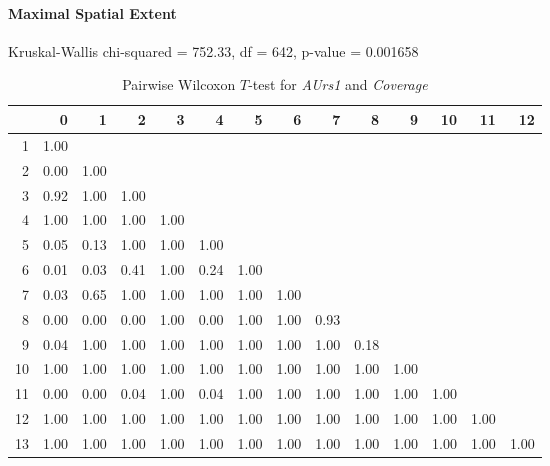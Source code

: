 \paragraph{Maximal Spatial Extent}
Kruskal-Wallis chi-squared = 752.33, df = 642, p-value = 0.001658

\begin{table}[ht]
	\small
	\centering
	\begin{tabular}{rrrrrrrrrrrrrr}
		\hline
	   & 0 & 1 & 2 & 3 & 4 & 5 & 6 & 7 & 8 & 9 & 10 & 11 & 12 \\ 
		\hline
	  1 & 1.00 &  &  &  &  &  &  &  &  &  &  &  &  \\ 
		2 & 0.00 & 1.00 &  &  &  &  &  &  &  &  &  &  &  \\ 
		3 & 0.92 & 1.00 & 1.00 &  &  &  &  &  &  &  &  &  &  \\ 
		4 & 1.00 & 1.00 & 1.00 & 1.00 &  &  &  &  &  &  &  &  &  \\ 
		5 & 0.05 & 0.13 & 1.00 & 1.00 & 1.00 &  &  &  &  &  &  &  &  \\ 
		6 & 0.01 & 0.03 & 0.41 & 1.00 & 0.24 & 1.00 &  &  &  &  &  &  &  \\ 
		7 & 0.03 & 0.65 & 1.00 & 1.00 & 1.00 & 1.00 & 1.00 &  &  &  &  &  &  \\ 
		8 & 0.00 & 0.00 & 0.00 & 1.00 & 0.00 & 1.00 & 1.00 & 0.93 &  &  &  &  &  \\ 
		9 & 0.04 & 1.00 & 1.00 & 1.00 & 1.00 & 1.00 & 1.00 & 1.00 & 0.18 &  &  &  &  \\ 
		10 & 1.00 & 1.00 & 1.00 & 1.00 & 1.00 & 1.00 & 1.00 & 1.00 & 1.00 & 1.00 &  &  &  \\ 
		11 & 0.00 & 0.00 & 0.04 & 1.00 & 0.04 & 1.00 & 1.00 & 1.00 & 1.00 & 1.00 & 1.00 &  &  \\ 
		12 & 1.00 & 1.00 & 1.00 & 1.00 & 1.00 & 1.00 & 1.00 & 1.00 & 1.00 & 1.00 & 1.00 & 1.00 &  \\ 
		13 & 1.00 & 1.00 & 1.00 & 1.00 & 1.00 & 1.00 & 1.00 & 1.00 & 1.00 & 1.00 & 1.00 & 1.00 & 1.00 \\ 
		 \hline
	  \end{tabular}
    \caption{Pairwise Wilcoxon $T$-test for \textit{AUrs1} and \textit{Coverage}}
    \label{tbl:wilcoxon_baysis_initiator_AUrs1_Cov}
\end{table}
